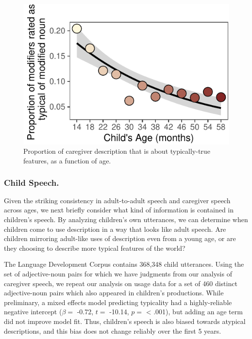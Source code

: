 \documentclass[10pt, letterpaper]{article}
\newenvironment{CodeChunk}{}{}
\begin{document}
\begin{CodeChunk}
\begin{figure}[tb]

{\centering \includegraphics{figs/prototypical_plot-1} 

}

\caption[Proportion of caregiver description that is about typically-true features, as a function of age]{Proportion of caregiver description that is about typically-true features, as a function of age.}\label{fig:prototypical_plot}
\end{figure}
\end{CodeChunk}

\hypertarget{child-speech.}{%
\subsubsection{Child Speech.}\label{child-speech.}}

Given the striking consistency in adult-to-adult speech and caregiver
speech across ages, we next briefly consider what kind of information is
contained in children's speech. By analyzing children's own utterances,
we can determine when children come to use description in a way that
looks like adult speech. Are children mirroring adult-like uses of
description even from a young age, or are they choosing to describe more
typical features of the world?

The Language Development Corpus contains 368,348 child utterances. Using
the set of adjective-noun pairs for which we have judgments from our
analysis of caregiver speech, we repeat our analysis on usage data for a
set of 460 distinct adjective-noun pairs which also appeared in
children's productions. While preliminary, a mixed effects model
predicting typicality had a highly-reliable negative intercept
(\(\beta =\) -0.72, \(t =\) -10.14, \(p =\) \textless{} .001), but
adding an age term did not improve model fit. Thus, children's speech is
also biased towards atypical descriptions, and this bias does not change
reliably over the first 5 years.
\end{document}
